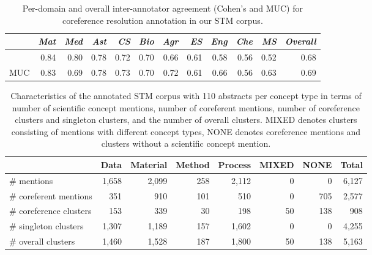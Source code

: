 \documentclass[runningheads]{llncs}
\begin{document}
\begin{table}[tb]
\centering
\small
\caption{Per-domain and overall inter-annotator agreement (Cohen's  and MUC) for coreference resolution annotation in our STM corpus.}
\begin{tabular}{l|rrrrrrrrrr|r}
	& \textit{Mat}	&\textit{Med}	&\textit{Ast}	&\textit{CS}	&\textit{Bio}	&\textit{Agr}	&\textit{ES}	&\textit{Eng}	&\textit{Che}	&\textit{MS} &\textit{Overall} \\ \hline
	& 0.84 & 0.80 & 0.78 & 0.72 & 0.70 & 0.66 & 0.61 & 0.58 & 0.56 & 0.52 & 0.68 \\ 
MUC & 0.83 & 0.69 & 0.78 & 0.73 & 0.70 & 0.72 & 0.61 & 0.66 & 0.56 & 0.63 & 0.69 \\
\end{tabular}
\label{table:ia_agreement}
\vspace{-1em}
\end{table}

\begin{table}[tb]
\centering
\small
\caption{Characteristics of the annotated STM corpus with 110 abstracts per concept type in terms of number of scientific concept mentions, number of coreferent mentions, number of coreference clusters and singleton clusters, and the number of overall clusters. MIXED denotes clusters consisting of mentions with different concept types, NONE denotes coreference mentions and clusters without a scientific concept mention.}
\label{tab:characteristics_per_concept}
\begin{tabular}{l|rrrr|rr|r}
                      & Data  & Material & Method & Process & MIXED  & NONE  & Total  \\ \hline
\# mentions            & 1,658 & 2,099 & 258 & 2,112 & 0  & 0   & 6,127 \\
\# coreferent mentions & 351  & 910  & 101 & 510  & 0  & 705 & 2,577 \\ \hline
\# coreference clusters            & 153  & 339  & 30  & 198  & 50 & 138 & 908  \\
\# singleton clusters          & 1,307 & 1,189 & 157 & 1,602 & 0  & 0   & 4,255 \\ \hline
\# overall clusters            & 1,460 & 1,528 & 187 & 1,800 & 50 & 138 & 5,163 \\ 
\end{tabular}
\end{table}
\end{document}
